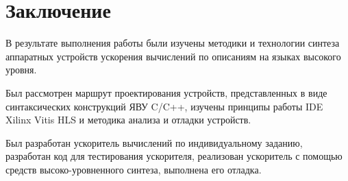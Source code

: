 \chapter*{Заключение}


В результате выполнения работы были изучены методики и технологии синтеза аппаратных устройств ускорения вычислений по описаниям на языках высокого уровня.  

Был рассмотрен маршрут проектирования устройств, представленных в виде синтаксических конструкций ЯВУ C/C++, изучены принципы работы IDE Xilinx Vitis HLS и методика анализа и отладки устройств.

Был разработан ускоритель вычислений по индивидуальному заданию, разработан код для тестирования ускорителя, реализован ускоритель с помощью средств высоко-уровненного синтеза, выполнена его отладка.